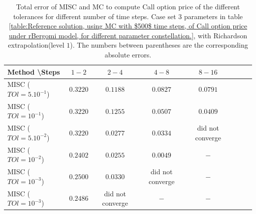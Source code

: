 \documentclass[11pt]{article}
\begin{document}
\begin{table}[h!]
	\centering
	\begin{tabular}{l*{6}{c}r}
		Method \textbackslash  Steps            & $1-2$ & $2-4$ & $4-8$ & $8-16$  \\
		\hline
		MISC ($TOl=5.10^{-1}$)  & $\mathbf{0.3220}$ & $\mathbf{0.1188}$ & $\mathbf{0.0827}$ & $\mathbf{0.0791}$ \\
		MISC ($TOl=10^{-1}$)  & $\mathbf{0.3220}$  & $\mathbf{0.1255}$ & $\mathbf{0.0507}$ & $\mathbf{0.0409}$  \\
		MISC ($TOl=5.10^{-2}$)  & $\mathbf{0.3220}$  & $\mathbf{0.0277}$ & $\mathbf{0.0334}$ & did not converge  \\
		
		MISC ($TOl=10^{-2}$)  & $\mathbf{0.2402}$ & $\mathbf{0.0255}$ & $\mathbf{0.0049}$ & $\mathbf{-}$  \\	
		
		MISC ($TOl=10^{-3}$)  &$\mathbf{0.2500}$  & $\mathbf{0.0330}$  & did not converge & $\mathbf{-}$ \\	
		
		MISC ($TOl=10^{-3}$)  &$\mathbf{0.2486}$  & did not converge & $\mathbf{-}$  & $\mathbf{-}$ \\	
		
		\hline
		
%		

	\end{tabular}
	\caption{Total  error of MISC and MC to compute Call option price of the different tolerances for different number of time steps. Case set $3$ parameters in table \ref{table:Reference solution, using MC with $500$ time steps, of Call option price under rBergomi model, for different parameter constellation.}, with Richardson extrapolation(level $1$). The numbers between parentheses are the corresponding absolute errors.}
	\label{Total  error of MISC and MC to compute Call option price of the different tolerances for different number of time steps. Case set $3$ parameters, with Richardson extrapolation(level $1$). The numbers between parentheses are the corresponding absolute errors.}
\end{table}
\end{document}
